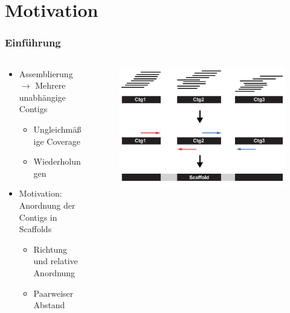 \documentclass[xcolor=pst]{beamer}
\begin{document}
\section{Motivation}
\begin{frame}
\setcounter{framenumber}{1}
  \frametitle{Einführung}

  \begin{columns}
    \begin{column}{.45\textwidth}
      \begin{itemize}
      \item Assemblierung $\rightarrow$ Mehrere unabhängige Contigs
      \begin{itemize}
        \item Ungleichmäßige Coverage
        \item Wiederholungen
      \end{itemize}
      \item Motivation: Anordnung der Contigs in Scaffolds
      \begin{itemize}
        \item Richtung und relative Anordnung
        \item Paarweiser Abstand
      \end{itemize}
      \end{itemize}
    \end{column}
    \begin{column}{.45\textwidth}
      \begin{center}
        \begin{figure}[t]
          \includegraphics[width=\textwidth,height=0.8\textheight,keepaspectratio]{figures/Scaffolding.pdf}
        \end{figure}
      \end{center}
    \end{column}
  \end{columns}
\end{frame}
\end{document}
